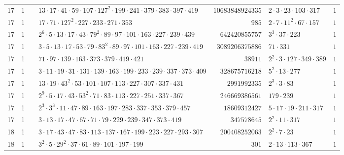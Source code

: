 \documentclass[a4paper,twoside,10pt]{report}
\renewcommand{\checkmark}{\text{\ding{51}}}
\newcommand{\cross}{\text{\ding{55}}}
\begin{document}
\begin{longtable}{rrcp{5cm}rp{5cm}r}
17 & 1 & \checkmark& $13 \cdot 17 \cdot 41 \cdot 59 \cdot 107 \cdot 127^{2} \cdot 199 \cdot 241 \cdot 379 \cdot 383 \cdot 397 \cdot 419$ & $10683848924335$ & $2 \cdot 3 \cdot 23 \cdot 103 \cdot 317$ & $1$\\
17 & 1 & \cross& $17 \cdot 71 \cdot 127^{2} \cdot 227 \cdot 233 \cdot 271 \cdot 353$ & $985$ & $2 \cdot 7 \cdot 11^{2} \cdot 67 \cdot 157$ & $1$\\
17 & 1 & \checkmark& $2^{6} \cdot 5 \cdot 13 \cdot 17 \cdot 43 \cdot 79^{2} \cdot 89 \cdot 97 \cdot 101 \cdot 163 \cdot 227 \cdot 239 \cdot 439$ & $642420855757$ & $3^{3} \cdot 37 \cdot 223$ & $1$\\
17 & 1 & \checkmark& $3 \cdot 5 \cdot 13 \cdot 17 \cdot 53 \cdot 79 \cdot 83^{2} \cdot 89 \cdot 97 \cdot 101 \cdot 163 \cdot 227 \cdot 239 \cdot 419$ & $3089206375886$ & $71 \cdot 331$ & $1$\\
17 & 1 & \cross& $71 \cdot 97 \cdot 139 \cdot 163 \cdot 373 \cdot 379 \cdot 419 \cdot 421$ & $38911$ & $2^{2} \cdot 3 \cdot 127 \cdot 349 \cdot 389$ & $1$\\
17 & 1 & \checkmark& $3 \cdot 11 \cdot 19 \cdot 31 \cdot 131 \cdot 139 \cdot 163 \cdot 199 \cdot 233 \cdot 239 \cdot 337 \cdot 373 \cdot 409$ & $328675716218$ & $5^{2} \cdot 13 \cdot 277$ & $1$\\
17 & 1 & \checkmark& $13 \cdot 19 \cdot 43^{2} \cdot 53 \cdot 101 \cdot 107 \cdot 113 \cdot 227 \cdot 307 \cdot 337 \cdot 431$ & $2991992335$ & $2^{3} \cdot 3 \cdot 83$ & $1$\\
17 & 1 & \checkmark& $2^{9} \cdot 5 \cdot 17 \cdot 43 \cdot 53^{2} \cdot 71 \cdot 83 \cdot 113 \cdot 227 \cdot 251 \cdot 337 \cdot 367$ & $246669386561$ & $179 \cdot 239$ & $1$\\
17 & 1 & \checkmark& $2^{3} \cdot 3^{3} \cdot 11 \cdot 47 \cdot 89 \cdot 163 \cdot 197 \cdot 283 \cdot 337 \cdot 353 \cdot 379 \cdot 457$ & $18609312427$ & $5 \cdot 17 \cdot 19 \cdot 211 \cdot 317$ & $1$\\
17 & 1 & \checkmark& $3 \cdot 13 \cdot 17 \cdot 47 \cdot 67 \cdot 71 \cdot 79 \cdot 229 \cdot 239 \cdot 347 \cdot 373 \cdot 419$ & $347578645$ & $2^{2} \cdot 11 \cdot 317$ & $1$\\
18 & 1 & \checkmark& $3 \cdot 17 \cdot 43 \cdot 47 \cdot 83 \cdot 113 \cdot 137 \cdot 167 \cdot 199 \cdot 223 \cdot 227 \cdot 293 \cdot 307$ & $200408252063$ & $2^{2} \cdot 7 \cdot 23$ & $1$\\
18 & 1 & \cross& $3^{2} \cdot 5 \cdot 29^{2} \cdot 37 \cdot 61 \cdot 89 \cdot 101 \cdot 197 \cdot 199$ & $301$ & $2 \cdot 13 \cdot 113 \cdot 367$ & $1$\\

\end{longtable}
\end{document}
